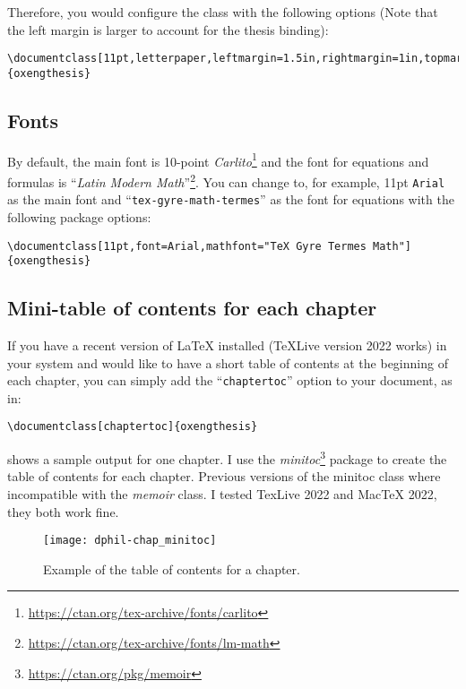 Therefore, you would configure the class with the following options (Note that the left margin is larger to account for the thesis binding):


\begin{lstlisting}[style=custom-latex]
\documentclass[11pt,letterpaper,leftmargin=1.5in,rightmargin=1in,topmargin=1in,bottommargin=1in]{oxengthesis}
\end{lstlisting}


\subsection{Fonts}


By default, the main font is 10-point \textit{Carlito}\footnote{\url{https://ctan.org/tex-archive/fonts/carlito}} and the font for equations and formulas is ``\textit{Latin Modern Math}''\footnote{\url{https://ctan.org/tex-archive/fonts/lm-math}}. You can change to, for example, 11pt \verb|Arial| as the main font and ``\verb|tex-gyre-math-termes|'' as the font for equations with the following package options:


\begin{lstlisting}[style=custom-latex]
\documentclass[11pt,font=Arial,mathfont="TeX Gyre Termes Math"]{oxengthesis}
\end{lstlisting}


\subsection{Mini-table of contents for each chapter}


If you have a recent version of LaTeX installed (TeXLive version 2022 works) in your system and would like to have a short table of contents at the beginning of each chapter, you can simply add the ``\verb|chaptertoc|'' option to your document, as in:


\begin{lstlisting}[style=custom-latex]
\documentclass[chaptertoc]{oxengthesis}
\end{lstlisting}


 shows a sample output for one chapter. I use the \textit{minitoc}\footnote{\url{https://ctan.org/pkg/memoir}} package to create the table of contents for each chapter. Previous versions of the minitoc class where incompatible with the \textit{memoir} class. I tested TexLive 2022 and MacTeX 2022, they both work fine.


\begin{figure}[htb]
    \centering
    \texttt{[image: dphil-chap\_minitoc]}
    \caption[Example of the table of contents for a chapter]
    {
        Example of the table of contents for a chapter.
        \label{fig:ch0:dphil-chap_minitoc}
    }
\end{figure}


